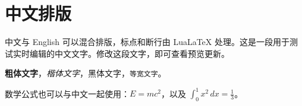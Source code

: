 \documentclass[fontset=fandol]{ctexart}
\begin{document}
\section{中文排版}

中文与 English 可以混合排版，标点和断行由 LuaLaTeX 处理。这是一段用于测试实时编辑的中文文字。修改这段文字，即可查看预览更新。

\textbf{粗体文字}，\textit{楷体文字}，\textsf{黑体文字}，\texttt{等宽文字}。

数学公式也可以与中文一起使用：$E=mc^2$，以及 $\int_0^1 x^2\,dx=\frac{1}{3}$。
\end{document}
